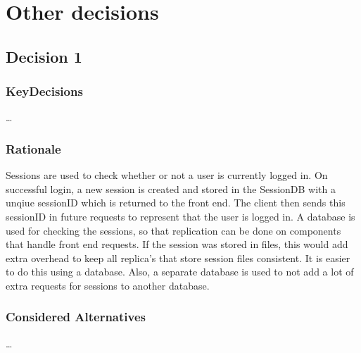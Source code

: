
\showdecisionsnotes{}


\newpage

\newpage

\newpage

\newpage

\newpage

\newpage


\section{Other decisions}

    \subsection{Decision 1}
        \subsubsection*{KeyDecisions}
            \ldots

        \subsubsection*{Rationale}
            Sessions are used to check whether or not a user is currently logged in.
            On successful login, a new session is created and stored in the SessionDB with a unqiue sessionID which is
            returned to the front end. The client then sends this sessionID in future requests to represent that the user
            is logged in.
            A database is used for checking the sessions, so that replication can be done on components that handle front
            end requests. If the session was stored in files, this would add extra overhead to keep all replica’s that store
            session files consistent.
            It is easier to do this using a database.
            Also, a separate database is used to not
            add a lot of extra requests for sessions to another database.

        \subsubsection*{Considered Alternatives}
            \ldots

